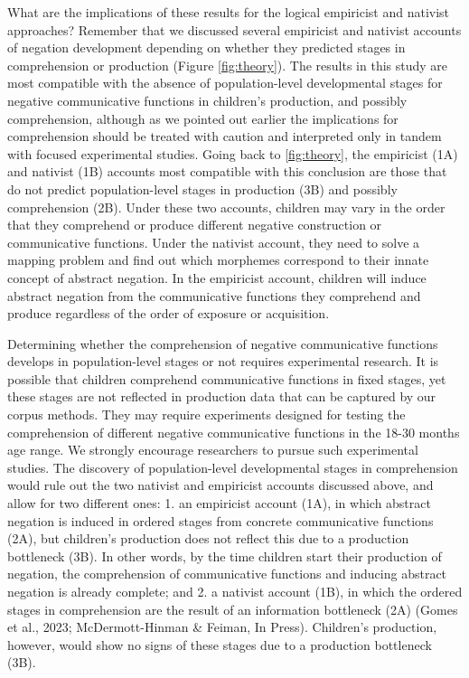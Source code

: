 \documentclass[
  man,floatsintext]{apa6}
\begin{document}
What are the implications of these results for the logical empiricist and nativist approaches? Remember that we discussed several empiricist and nativist accounts of negation development depending on whether they predicted stages in comprehension or production (Figure \ref{fig:theory}). The results in this study are most compatible with the absence of population-level developmental stages for negative communicative functions in children's production, and possibly comprehension, although as we pointed out earlier the implications for comprehension should be treated with caution and interpreted only in tandem with focused experimental studies. Going back to \ref{fig:theory}, the empiricist (1A) and nativist (1B) accounts most compatible with this conclusion are those that do not predict population-level stages in production (3B) and possibly comprehension (2B). Under these two accounts, children may vary in the order that they comprehend or produce different negative construction or communicative functions. Under the nativist account, they need to solve a mapping problem and find out which morphemes correspond to their innate concept of abstract negation. In the empiricist account, children will induce abstract negation from the communicative functions they comprehend and produce regardless of the order of exposure or acquisition.

Determining whether the comprehension of negative communicative functions develops in population-level stages or not requires experimental research. It is possible that children comprehend communicative functions in fixed stages, yet these stages are not reflected in production data that can be captured by our corpus methods. They may require experiments designed for testing the comprehension of different negative communicative functions in the 18-30 months age range. We strongly encourage researchers to pursue such experimental studies. The discovery of population-level developmental stages in comprehension would rule out the two nativist and empiricist accounts discussed above, and allow for two different ones: 1. an empiricist account (1A), in which abstract negation is induced in ordered stages from concrete communicative functions (2A), but children's production does not reflect this due to a production bottleneck (3B). In other words, by the time children start their production of negation, the comprehension of communicative functions and inducing abstract negation is already complete; and 2. a nativist account (1B), in which the ordered stages in comprehension are the result of an information bottleneck (2A) (Gomes et al., 2023; McDermott-Hinman \& Feiman, In Press). Children's production, however, would show no signs of these stages due to a production bottleneck (3B).
\end{document}
